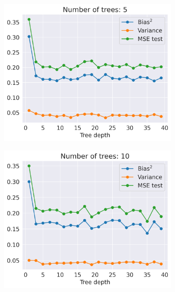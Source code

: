 \documentclass[11pt]{article}
\begin{document}
\begin{figure}[H]
    \begin{subfigure}{.5\textwidth}
        \centering
        \includegraphics[width=.9\textwidth]{figures/tradeoff_RF_trees_5.png}
        \label{fig:}
    \end{subfigure}
    \begin{subfigure}{.5\textwidth}
        \centering
        \includegraphics[width=.9\textwidth]{figures/tradeoff_RF_trees_10.png}
        \label{fig:}
    \end{subfigure}
    \begin{subfigure}{.5\textwidth}
        \centering

\end{subfigure}
\end{figure}
\end{document}
